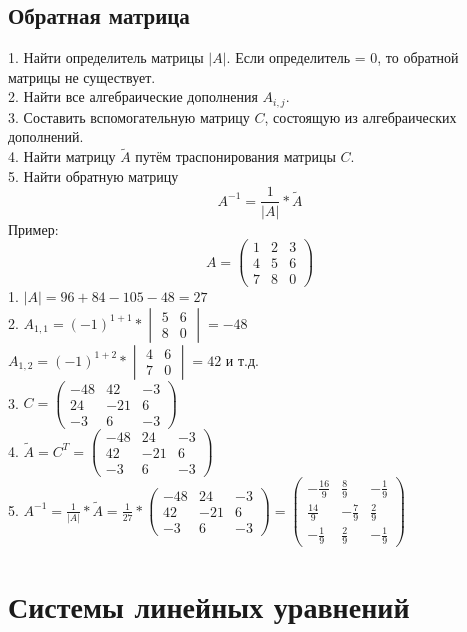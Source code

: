 \documentclass[12pt,a4paper]{article}
\begin{document}
\subsection{Обратная матрица}
1. Найти определитель матрицы $|A|$. Если определитель = 0, то обратной матрицы не существует. \\
2. Найти все алгебраические дополнения $A_{i,j}$. \\
3. Составить вспомогательную матрицу $C$, состоящую из алгебраических дополнений. \\
4. Найти матрицу $\tilde{A}$ путём траспонирования матрицы $C$. \\
5. Найти обратную матрицу $$A^{-1}=\frac{1}{|A|}*\tilde{A}$$
Пример:
$$A=\begin{pmatrix}
1& 2& 3 \\
4& 5& 6 \\
7& 8& 0
\end{pmatrix}$$
1. $|A|=96+84-105-48=27$ \\
2. $A_{1,1}=(-1)^{1+1}*\begin{vmatrix}
5& 6 \\
8& 0
\end{vmatrix}=-48$\\
$A_{1,2}=(-1)^{1+2}*\begin{vmatrix}
4& 6 \\
7& 0
\end{vmatrix}=42$ и т.д. \\
3. $C=\begin{pmatrix}
-48& 42& -3 \\
24& -21& 6 \\
-3& 6& -3
\end{pmatrix}$ \\
4. $\tilde{A}=C^{T}=\begin{pmatrix}
-48& 24& -3 \\
42& -21& 6 \\
-3& 6& -3
\end{pmatrix}$ \\
5. $A^{-1}=\frac{1}{|A|}*\tilde{A}=\frac{1}{27}*\begin{pmatrix}
-48& 24& -3 \\
42& -21& 6 \\
-3& 6& -3
\end{pmatrix}=\begin{pmatrix}
-\frac{16}{9}& \frac{8}{9}& -\frac{1}{9} \\
\frac{14}{9}& -\frac{7}{9}& \frac{2}{9} \\
-\frac{1}{9}& \frac{2}{9}& -\frac{1}{9}
\end{pmatrix}$
\section{Системы линейных уравнений}
\end{document}
